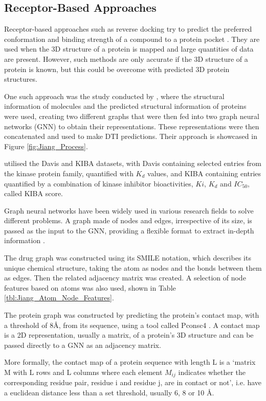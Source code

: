\subsection{Receptor-Based Approaches}

Receptor-based approaches such as reverse docking try to predict the preferred conformation and binding strength of a compound to a protein pocket \citep{Shar2016}. They are used when the 3D structure of a protein is mapped and large quantities of data are present. However, such methods are only accurate if the 3D structure of a protein is known, but this could be overcome with predicted 3D protein structures.

One such approach was the study conducted by \citet{Jiang2020}, where the structural information of molecules and the predicted structural information of proteins were used, creating two different graphs that were then fed into two graph neural networks (GNN) to obtain their representations. These representations were then concatenated and used to make DTI predictions. Their approach is showcased in Figure \ref{fig:Jiang_Process}.

\citet{Jiang2020} utilised the Davis \citep{Davis_Dataset} and KIBA \citep{KIBA_Dataset_1, KIBA_Dataset_2} datasets, with Davis containing selected entries from the kinase protein family, quantified with $K_d$ values, and KIBA containing entries quantified by a combination of kinase inhibitor bioactivities, $Ki$, $K_d$ and $IC_{50}$, called KIBA score.

Graph neural networks have been widely used in various research fields to solve different problems. A graph made of nodes and edges, irrespective of its size, is passed as the input to the GNN, providing a flexible format to extract in-depth information \citep{Jiang2020}. 

The drug graph was constructed using its SMILE notation, which describes its unique chemical structure, taking the atom as nodes and the bonds between them as edges. Then the related adjacency matrix was created. A selection of node features based on atoms was also used, shown in Table \ref{tbl:Jiang_Atom_Node_Features}.

The protein graph was constructed by predicting the protein's contact map, with a threshold of 8\AA, from its sequence, using a tool called Pconsc4 \citep{Pconsc4}. A contact map is a 2D representation, usually a matrix, of a protein's 3D structure and can be passed directly to a GNN as an adjacency matrix.  

More formally, the contact map of a protein sequence with length L is a `matrix M with L rows and L columns where each element $M_{ij}$ indicates whether the corresponding residue pair, residue i and residue j, are in contact or not', i.e. have a euclidean distance less than a set threshold, usually 6, 8 or 10 \AA.

